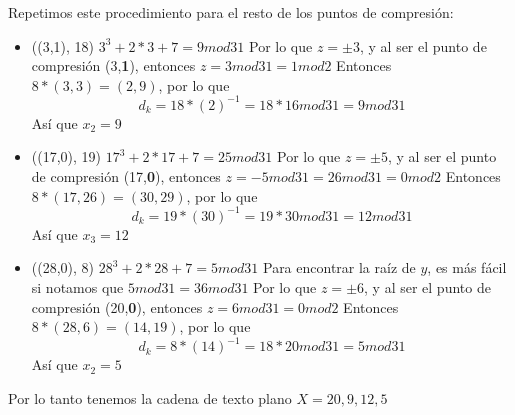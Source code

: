 Repetimos este procedimiento para el resto de los puntos de compresión:
\begin{itemize}
    \item ((3,1), 18)
        $3^{3} + 2*3 + 7  = 9 mod 31$
        Por lo que $z = \pm 3$, y al ser el punto de compresión (3,\textbf{1}), entonces $z = 3 mod 31 = 1 mod 2$
        Entonces $8*(3,3) = (2,9)$, por lo que 
        \begin{equation}
            d_{k} = 18*(2)^{-1} = 18*16 mod 31 = 9 mod 31
        \end{equation}
        Así que $x_{2} = 9$
    \item ((17,0), 19)
        $17^{3} + 2*17 + 7  = 25 mod 31$
        Por lo que $z = \pm 5$, y al ser el punto de compresión (17,\textbf{0}), entonces $z = -5 mod 31 = 26 mod 31 = 0 mod 2$
        Entonces $8*(17,26) = (30,29)$, por lo que 
        \begin{equation}
            d_{k} = 19*(30)^{-1} = 19*30 mod 31 = 12 mod 31
        \end{equation}
        Así que $x_{3} = 12$
        
    \item ((28,0), 8)
        $28^{3} + 2*28 + 7  = 5 mod 31$
        Para encontrar la raíz de $y$, es más fácil si notamos que $5 mod 31 = 36 mod 31$
        Por lo que $z = \pm 6$, y al ser el punto de compresión (20,\textbf{0}), entonces $z = 6 mod 31 = 0 mod 2$
        Entonces $8*(28,6) = (14,19)$, por lo que 
        \begin{equation}
            d_{k} = 8*(14)^{-1} = 18*20 mod 31 = 5 mod 31
        \end{equation}
        Así que $x_{2} = 5$
\end{itemize}

Por lo tanto tenemos la cadena de texto plano $X =20, 9, 12, 5$